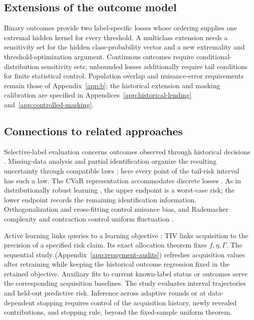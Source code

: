 \subsection{Extensions of the outcome model}
\label{app:outcome-extensions}

Binary outcomes provide two label-specific losses whose ordering supplies one extremal hidden kernel for every threshold. A multiclass extension needs a sensitivity set for the hidden class-probability vector and a new extremality and threshold-optimization argument. Continuous outcomes require conditional-distribution sensitivity sets; unbounded losses additionally require tail conditions for finite statistical control. Population overlap and nuisance-error requirements remain those of Appendix~\ref{app:b}; the historical extension and masking calibration are specified in Appendices~\ref{app:historical-lending} and~\ref{app:controlled-masking}.

\subsection{Connections to related approaches}
\label{app:connections}

Selective-label evaluation concerns outcomes observed through historical decisions \citep{chen2025selective,coston2021fairness,lakkaraju2017selective}. Missing-data analysis and partial identification organize the resulting uncertainty through compatible laws \citep{little2019statistical,manski1989anatomy,manski1990nonparametric,manski2003partial}; here every point of the tail-risk interval has such a law. The CVaR representation accommodates discrete losses \citep{rockafellar2002conditional}. As in distributionally robust learning \citep{blanchet2019quantifying,delage2010distributionally,duchi2021uniform,mohajerin2018data}, the upper endpoint is a worst-case risk; the lower endpoint records the remaining identification information. Orthogonalization \citep{chernozhukov2018double,kallus2024localized,robins1994estimation} and cross-fitting \citep{chernozhukov2018double,kallus2024localized} control nuisance bias, and Rademacher complexity and contraction control uniform fluctuation \citep{bartlett2002rademacher,maurer2016vector,van1996weak}.

Active learning links queries to a learning objective \citep{cohn1996active}; TIV links acquisition to the precision of a specified risk claim. Its exact allocation theorem fixes $f,\eta,\Gamma$. The sequential study (Appendix~\ref{app:repayment-audits}) refreshes acquisition values after retraining while keeping the historical outcome regression fixed in the retained objective. Auxiliary fits to current known-label status or outcomes serve the corresponding acquisition baselines. The study evaluates interval trajectories and held-out predictive risk. Inference across adaptive rounds or at data-dependent stopping requires control of the acquisition history, newly revealed contributions, and stopping rule, beyond the fixed-sample uniform theorem.

